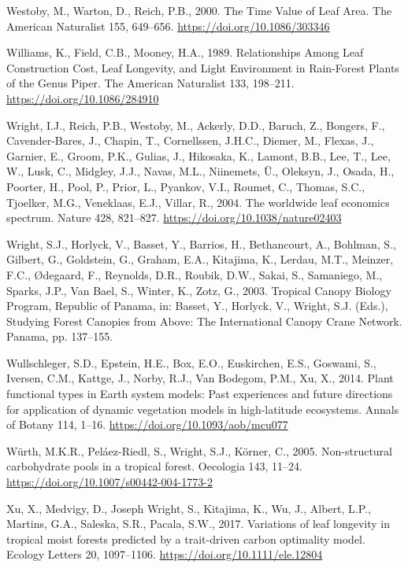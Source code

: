 \documentclass[
  12pt,
  letterpaper,
  DIV=11,
  numbers=noendperiod]{scrartcl}
\newlength{\cslhangindent}
\newenvironment{CSLReferences}[2] %
 {\begin{list}{}{%
  \setlength{\itemindent}{0pt}
  \setlength{\leftmargin}{0pt}
  \setlength{\parsep}{0pt}
  \ifodd #1
   \setlength{\leftmargin}{\cslhangindent}
   \setlength{\itemindent}{-1\cslhangindent}
  \fi
  \setlength{\itemsep}{#2\baselineskip}}}
 {\end{list}}
\begin{document}
\begin{CSLReferences}{1}{0}
Westoby, M., Warton, D., Reich, P.B., 2000. The {Time Value} of {Leaf
Area}. The American Naturalist 155, 649--656.
\url{https://doi.org/10.1086/303346}

Williams, K., Field, C.B., Mooney, H.A., 1989. Relationships {Among Leaf
Construction Cost}, {Leaf Longevity}, and {Light Environment} in
{Rain-Forest Plants} of the {Genus Piper}. The American Naturalist 133,
198--211. \url{https://doi.org/10.1086/284910}

Wright, I.J., Reich, P.B., Westoby, M., Ackerly, D.D., Baruch, Z.,
Bongers, F., Cavender-Bares, J., Chapin, T., Cornellssen, J.H.C.,
Diemer, M., Flexas, J., Garnier, E., Groom, P.K., Gulias, J., Hikosaka,
K., Lamont, B.B., Lee, T., Lee, W., Lusk, C., Midgley, J.J., Navas,
M.L., Niinemets, Ü., Oleksyn, J., Osada, H., Poorter, H., Pool, P.,
Prior, L., Pyankov, V.I., Roumet, C., Thomas, S.C., Tjoelker, M.G.,
Veneklaas, E.J., Villar, R., 2004. The worldwide leaf economics
spectrum. Nature 428, 821--827.
\url{https://doi.org/10.1038/nature02403}

Wright, S.J., Horlyck, V., Basset, Y., Barrios, H., Bethancourt, A.,
Bohlman, S., Gilbert, G., Goldstein, G., Graham, E.A., Kitajima, K.,
Lerdau, M.T., Meinzer, F.C., Ødegaard, F., Reynolds, D.R., Roubik, D.W.,
Sakai, S., Samaniego, M., Sparks, J.P., Van Bael, S., Winter, K., Zotz,
G., 2003. Tropical {Canopy Biology Program}, {Republic} of {Panama}, in:
Basset, Y., Horlyck, V., Wright, S.J. (Eds.), Studying {Forest Canopies}
from {Above}: {The International Canopy Crane Network}. Panama, pp.
137--155.

Wullschleger, S.D., Epstein, H.E., Box, E.O., Euskirchen, E.S., Goswami,
S., Iversen, C.M., Kattge, J., Norby, R.J., Van Bodegom, P.M., Xu, X.,
2014. Plant functional types in {Earth} system models: {Past}
experiences and future directions for application of dynamic vegetation
models in high-latitude ecosystems. Annals of Botany 114, 1--16.
\url{https://doi.org/10.1093/aob/mcu077}

Würth, M.K.R., Peláez-Riedl, S., Wright, S.J., Körner, C., 2005.
Non-structural carbohydrate pools in a tropical forest. Oecologia 143,
11--24. \url{https://doi.org/10.1007/s00442-004-1773-2}

Xu, X., Medvigy, D., Joseph Wright, S., Kitajima, K., Wu, J., Albert,
L.P., Martins, G.A., Saleska, S.R., Pacala, S.W., 2017. Variations of
leaf longevity in tropical moist forests predicted by a trait-driven
carbon optimality model. Ecology Letters 20, 1097--1106.
\url{https://doi.org/10.1111/ele.12804}

\end{CSLReferences}
\end{document}
